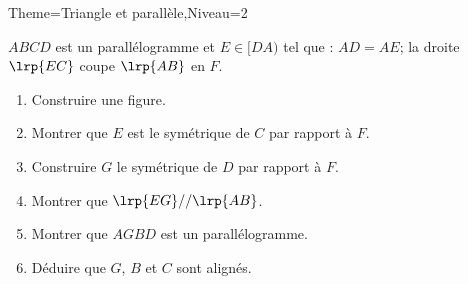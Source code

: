 \documentclass[a4paper,12pt]{article}
\begin{document}
\begin{Maquette}[Fiche]{Theme=Triangle et parallèle,Niveau=2}
\begin{exercice}
$ABCD$ est un parallélogramme et $E\in [DA)$ tel que : $AD=AE$; la droite $\lrp{EC}$ coupe $\lrp{AB}$ en $F$.
\begin{enumerate}
\item Construire une figure.
\item Montrer que $E$ est le symétrique de $C$ par rapport à $F$.
\item Construire $G$ le symétrique de $D$ par rapport à $F$.
\item Montrer que $\lrp{EG}//\lrp{AB}$.
\item Montrer que $AGBD$ est un parallélogramme.
\item Déduire que $G$, $B$ et $C$ sont alignés.
\end{enumerate} 
\end{exercice}

































\end{Maquette}
\end{document}
